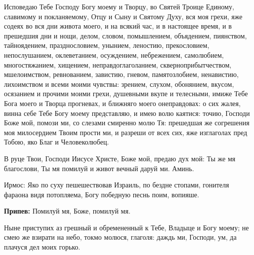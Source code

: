 

Исповедаю Тебе Господу Богу моему и Творцу, во Святей Троице Единому, славимому и покланяемому, Отцу и Сыну и Святому Духу, вся моя грехи, яже содеях во вся дни живота моего, и на всякий час, и в настоящее время, и в прешедшия дни и нощи, делом, словом, помышлением, объядением, пиянством, тайноядением, празднословием, унынием, леностию, прекословием, непослушанием, оклеветанием, осуждением, небрежением, самолюбием, многостяжанием, хищением, неправдоглаголанием, скверноприбытчеством, мшелоимством, ревнованием, завистию, гневом, памятозлобием, ненавистию, лихоимством и всеми моими чувствы: зрением, слухом, обонянием, вкусом, осязанием и прочими моими грехи, душевными вкупе и телесными, имиже Тебе Бога моего и Творца прогневах, и ближняго моего онеправдовах: о сих жалея, винна себе Тебе Богу моему представляю, и имею волю каятися: точию, Господи Боже мой, помози ми, со слезами смиренно молю Тя: прешедшая же согрешения моя милосердием Твоим прости ми, и разреши от всех сих, яже изглаголах пред Тобою, яко Благ и Человеколюбец.






В руце Твои, Господи Иисусе Христе, Боже мой, предаю дух мой: Ты же мя благослови, Ты мя помилуй и живот вечный даруй ми. Аминь. 
\mychapterending

 





  Ирмос: Яко по суху пешешествовав Израиль, по бездне стопами, гонителя фараона видя потопляема, Богу победную песнь поим, вопияше.


\textbf{Припев:} Помилуй мя, Боже, помилуй мя.





Ныне приступих аз грешный и обремененный к Тебе, Владыце и Богу моему; не смею же взирати на небо, токмо молюся, глаголя: даждь ми, Господи, ум, да плачуся дел моих горько.


